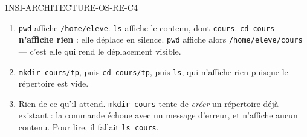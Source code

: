 \begin{corrige}{1NSI-ARCHITECTURE-OS-RE-C4}
\begin{enumerate}
  \item \lstinline{pwd} affiche \lstinline{/home/eleve}.
        \lstinline{ls} affiche le contenu, dont \lstinline{cours}.
        \lstinline{cd cours} \textbf{n'affiche rien} : elle déplace en silence.
        \lstinline{pwd} affiche alors \lstinline{/home/eleve/cours} — c'est elle qui rend le
        déplacement visible.
  \item \lstinline{mkdir cours/tp}, puis \lstinline{cd cours/tp}, puis \lstinline{ls}, qui
        n'affiche rien puisque le répertoire est vide.
  \item Rien de ce qu'il attend. \lstinline{mkdir cours} tente de \emph{créer} un répertoire
        déjà existant : la commande échoue avec un message d'erreur, et n'affiche aucun
        contenu. Pour lire, il fallait \lstinline{ls cours}.
\end{enumerate}
\end{corrige}
